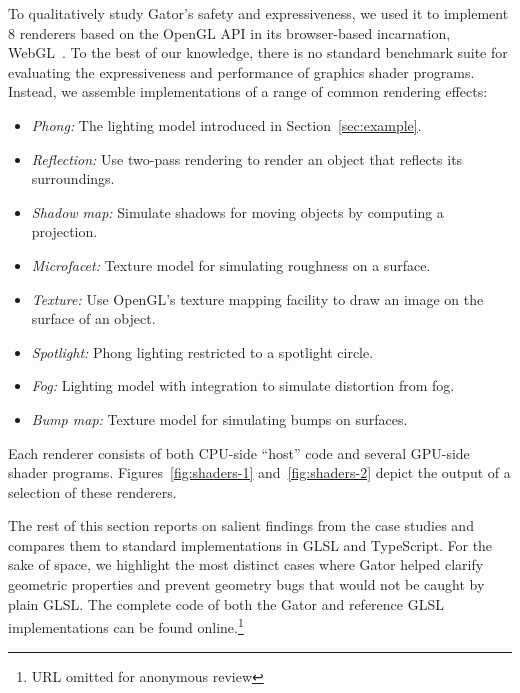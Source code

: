 {To qualitatively study Gator's safety and expressiveness, we used it to implement 8 renderers based on the OpenGL API in its browser-based incarnation, WebGL~\cite{webgl}.
To the best of our knowledge, there is no standard benchmark suite for evaluating the expressiveness and performance of graphics shader programs.
Instead, we assemble implementations of a range of common rendering effects:
%
\begin{itemize}
	\item \emph{Phong:} The lighting model introduced in Section~\ref{sec:example}.
	\item \emph{Reflection:} Use two-pass rendering to render an object that reflects its surroundings.
	\item \emph{Shadow map:} Simulate shadows for moving objects by computing a projection.
	\item \emph{Microfacet:} Texture model for simulating roughness on a surface.
	\item \emph{Texture:} Use OpenGL's texture mapping facility to draw an image on the surface of an object.
	\item \emph{Spotlight:} Phong lighting restricted to a spotlight circle.
	\item \emph{Fog:} Lighting model with integration to simulate distortion from fog.
	\item \emph{Bump map:} Texture model for simulating bumps on surfaces.
\end{itemize}
%
Each renderer consists of both CPU-side ``host'' code and several GPU-side shader programs.
Figures~\ref{fig:shaders-1} and~\ref{fig:shaders-2} depict the output of a selection of these renderers.

The rest of this section reports on salient findings from the case studies and compares them to standard implementations in GLSL and TypeScript.
For the sake of space, we highlight the most distinct cases where Gator helped clarify geometric properties and prevent geometry bugs that would not be caught by plain GLSL.  The complete code of both the Gator and reference GLSL implementations can be found online.\footnote{URL omitted for anonymous review}

}
